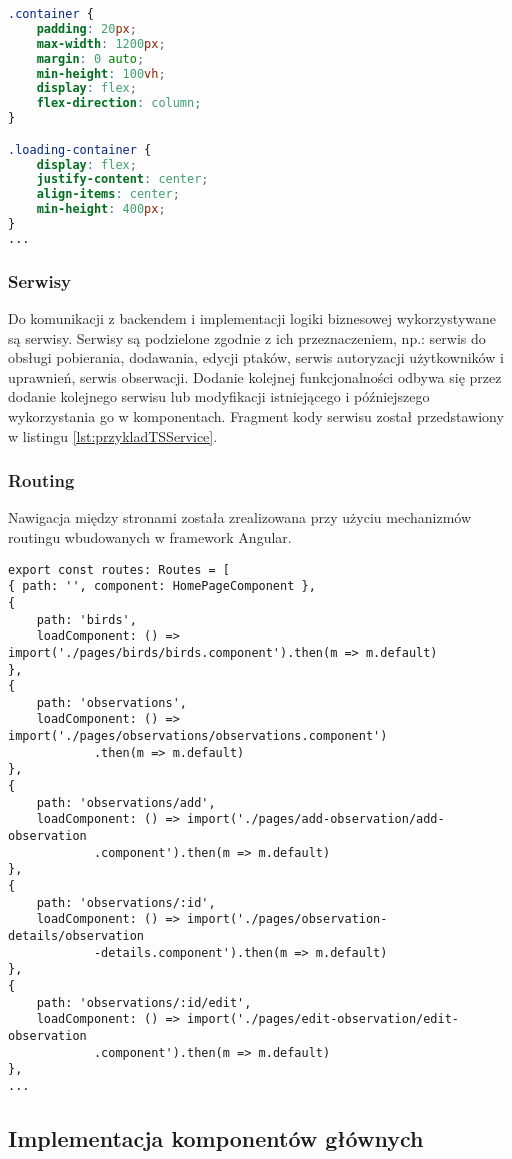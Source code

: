 \begin{lstlisting}[language=CSS, caption={Fragment styli css komponentu}]
.container {
	padding: 20px;
	max-width: 1200px;
	margin: 0 auto;
	min-height: 100vh;
	display: flex;
	flex-direction: column;
}

.loading-container {
	display: flex;
	justify-content: center;
	align-items: center;
	min-height: 400px;
}
...
\end{lstlisting}

\subsubsection{Serwisy}
Do komunikacji z backendem i implementacji logiki biznesowej wykorzystywane są serwisy. Serwisy są podzielone zgodnie z ich przeznaczeniem, np.: serwis do obsługi pobierania, dodawania, edycji ptaków, serwis autoryzacji użytkowników i uprawnień, serwis obserwacji.
Dodanie kolejnej funkcjonalności odbywa się przez dodanie kolejnego serwisu lub modyfikacji istniejącego i późniejszego wykorzystania go w komponentach. Fragment kody serwisu został przedstawiony w listingu \ref{lst:przykladTSService}.

\subsubsection{Routing}
Nawigacja między stronami została zrealizowana przy użyciu mechanizmów routingu wbudowanych w framework Angular.
\begin{lstlisting}[style=tsstyle, caption={Fragment kodu routingu}]
export const routes: Routes = [
{ path: '', component: HomePageComponent },
{
	path: 'birds',
	loadComponent: () => import('./pages/birds/birds.component').then(m => m.default)
},
{
	path: 'observations',
	loadComponent: () => import('./pages/observations/observations.component')
			.then(m => m.default)
},
{
	path: 'observations/add',
	loadComponent: () => import('./pages/add-observation/add-observation
			.component').then(m => m.default)
},
{
	path: 'observations/:id',
	loadComponent: () => import('./pages/observation-details/observation
			-details.component').then(m => m.default)
},
{
	path: 'observations/:id/edit',
	loadComponent: () => import('./pages/edit-observation/edit-observation
			.component').then(m => m.default)
},
...
\end{lstlisting}

\subsection{Implementacja komponentów głównych}

